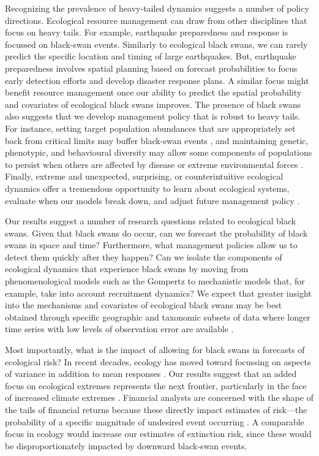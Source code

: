 Recognizing the prevalence of heavy-tailed dynamics suggests a number of
policy directions. Ecological resource management can draw from other
disciplines that focus on heavy tails. For example, earthquake preparedness
and response is focussed on black-swan events. Similarly to ecological black
swans, we can rarely predict the specific location and timing of large
earthquakes. But, earthquake preparedness involves spatial planning based on
forecast probabilities to focus early detection efforts and develop disaster
response plans. A similar focus might benefit resource management once our
ability to predict the spatial probability and covariates of ecological black
swans improves. The presence of black swans also suggests that we develop
management policy that is robust to heavy tails. For instance, setting target
population abundances that are appropriately set back from critical limits may
buffer black-swan events \citep[e.g.][]{caddy1996}, and maintaining genetic,
phenotypic, and behavioural diversity may allow some components of populations
to persist when others are affected by disease or extreme environmental forces
\citep[e.g.][]{hilborn2003, schindler2010, anderson2014}. Finally, extreme and
unexpected, surprising, or counterintuitive ecological dynamics offer a
tremendous opportunity to learn about ecological systems, evaluate when our
models break down, and adjust future management policy \citep{doak2008,
  pine-iii2009, lindenmayer2010}.

Our results suggest a number of research questions related to ecological black
swans. Given that black swans do occur, can we forecast the probability of
black swans in space and time? Furthermore, what management policies allow us
to detect them quickly after they happen? Can we isolate the components of
ecological dynamics that experience black swans by moving from
phenomenological models such as the Gompertz to mechanistic models that, for
example, take into account recruitment dynamics? We expect that greater
insight into the mechanisms and covariates of ecological black swans may be
best obtained through specific geographic and taxonomic subsets of data where
longer time series with low levels of observation error are available
\citep[e.g.][]{segura2013}.

Most importantly, what is the impact of allowing for black swans in forecasts
of ecological risk? In recent decades, ecology has moved toward focussing on
aspects of variance in addition to mean responses \citep[e.g.][]{loreau2010a,
  thompson2013}. Our results suggest that an added focus on ecological
extremes represents the next frontier, particularly in the face of increased
climate extremes \citep{meehl2004,thompson2013,ipcc2012}. Financial analysts
are concerned with the shape of the tails of financial returns because these
directly impact estimates of risk---the probability of a specific magnitude of
undesired event occurring \citep{rachev2008}. A comparable focus in ecology
would increase our estimates of extinction risk, since these would be
disproportionately impacted by downward black-swan events.


